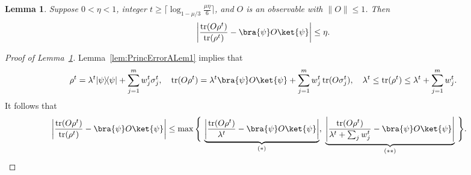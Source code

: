 \documentclass[aps,prl,twocolumn,nofootinbib,superscriptaddress,10pt]{revtex4-2}
\let\originalleft\left
\let\originalright\right
\renewcommand{\left}{\mathopen{}\mathclose\bgroup\originalleft}
\renewcommand{\right}{\aftergroup\egroup\originalright}
\newcommand{\ketbra}[2]{\ensuremath{\left|#1\right\rangle\!\left\langle#2\right|}}
\newcommand{\tr}[1]{\mathrm{tr}\left( #1 \right)}
\DeclareMathOperator{\Tr}{tr}
\theoremstyle{plain}
\newtheorem{lemma}{Lemma}
\theoremstyle{definition}
\newcommand{\lref}[1]{Lemma~\ref{#1}}
\begin{document}
\begin{lemma}\label{lem:PrincErrorA}
	Suppose $0<\eta<1$, integer $t\geq \lceil \log_{1-\mu/3}\frac{\mu\eta}{6}\rceil$, and $O$ is an observable with $\|O\|\leq 1$. Then 
	\begin{align}\label{eq:PrincErrorA}
		\left| \frac{\tr{O\rho^t}}{\tr{\rho^t}} - \bra{\psi}O\ket{\psi} \right|\leq \eta. 
	\end{align}
\end{lemma}



\begin{proof}[Proof of \lref{lem:PrincErrorA}]
	\lref{lem:PrincErrorALem1} implies that 
	\begin{align}\label{eq:PrincErrorArho^t}
		\rho^t = \lambda^t \ketbra{\psi}{\psi} + \sum_{j=1}^m w_j^t \sigma_j^t, 
		\quad
		\Tr(O\rho^t) = \lambda^t \bra{\psi}O\ket{\psi} + \sum_{j=1}^m w_j^t \Tr(O\sigma_j^t),
		\quad 
		\lambda^t \leq \Tr(\rho^t)\leq \lambda^t + \sum_{j=1}^m w_j^t . 
	\end{align}
	It follows that 
	\begin{align}\label{eq:ErrorAterm0}
		\left|\frac{\tr{O\rho^t}}{\tr{\rho^t}}-\bra{\psi}O\ket{\psi}\right|
		&\leq 
		\max\Bigg\{ \,
		\underbrace{\left|\frac{\tr{O\rho^t}}{\lambda^t}-\bra{\psi}O\ket{\psi}\right|}_{(*)}, \;
		\underbrace{\left|\frac{\tr{O\rho^t}}{\lambda^t + \sum_{j} w_j^t}-\bra{\psi}O\ket{\psi}\right|}_{(**)}
		\, \Bigg\}. 
	\end{align}
	

\end{proof}
\end{document}
